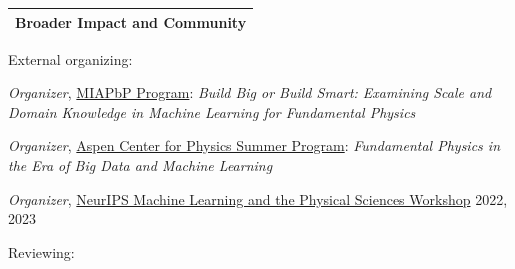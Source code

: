 \documentclass[letterpaper,11pt]{article}
\newenvironment{packed_itemize}{
\begin{itemize}[label=\raisebox{0.25ex}{\tiny$\bullet$}]
  \setlength{\itemsep}{4.2pt}
  \setlength{\parskip}{0pt}
  \setlength{\parsep}{0pt}}{\end{itemize}
}
\begin{document}

 
\noindent
\begin{tabular*}{\textwidth}{l@{\extracolsep{\fill}}}
\large {\sc \Large{Broader Impact and Community}}\\
\hline
\end{tabular*}\vspace{3.5mm}

\noindent
External organizing:

\begin{packed_itemize}
\item \begin{minipage}[t]{.84\linewidth}
      \emph{Organizer}, \href{https://www.munich-iapbp.de/}{MIAPbP Program}: 
      \emph{Build Big or Build Smart: Examining Scale and Domain Knowledge in Machine Learning for Fundamental Physics}
      \end{minipage}%
      \hfill%
      \begin{minipage}[t]{.16\linewidth}
      \vspace{0pt} 
      \end{minipage}\vspace{1.5mm}
\item \begin{minipage}[t]{.84\linewidth}
      \emph{Organizer}, \href{https://aspenphys.org/physicists/summer/program/currentworkshops.html}{Aspen Center for Physics Summer Program}: 
      \emph{Fundamental Physics in the Era of Big Data and Machine Learning}
      \end{minipage}%
      \hfill%
      \begin{minipage}[t]{.16\linewidth}
      \vspace{0pt} 
      \end{minipage}\vspace{1.5mm}
  \item \emph{Organizer}, \href{https://ml4physicalsciences.github.io/}{NeurIPS Machine Learning and the Physical Sciences Workshop} \hfill 2022, 2023
  \end{packed_itemize}
  \noindent
Reviewing:
\end{document}
